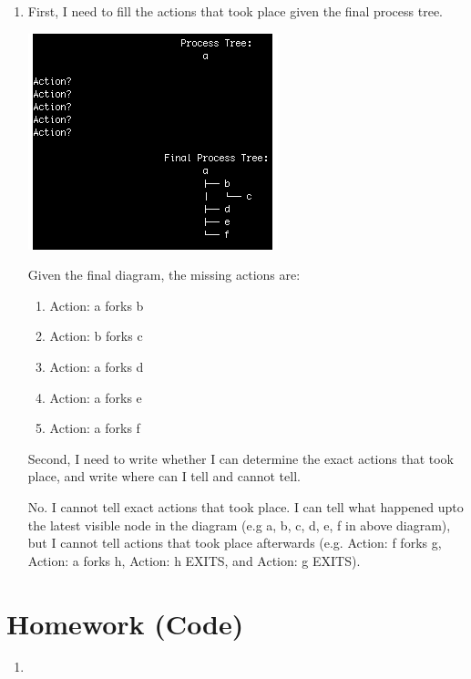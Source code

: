 \documentclass[12pt]{article}
\begin{document}
\begin{enumerate}[1.]
    \item

    First, I need to fill the actions that took place given the final process tree.

    \bigskip

    \begin{center}
    \includegraphics[width=0.7\linewidth]{images/worksheet_2_solution_13.png}
    \end{center}

    Given the final diagram, the missing actions are:

    \begin{enumerate}[1.]
        \item Action: a forks b
        \item Action: b forks c
        \item Action: a forks d
        \item Action: a forks e
        \item Action: a forks f
    \end{enumerate}

    Second, I need to write whether I can determine the exact actions that took place,
    and write where can I tell and cannot tell.

    \bigskip

    No. I cannot tell exact actions that took place. I can tell what happened upto
    the latest visible node in the diagram (e.g a, b, c, d, e, f in above diagram), but I cannot tell
    actions that took place afterwards (e.g. Action: f forks g, Action: a forks h, Action: h EXITS, and Action: g EXITS).

\end{enumerate}

\newpage

\section{Homework (Code)}

\begin{enumerate}[1.]
    \item
\end{enumerate}
\end{document}
